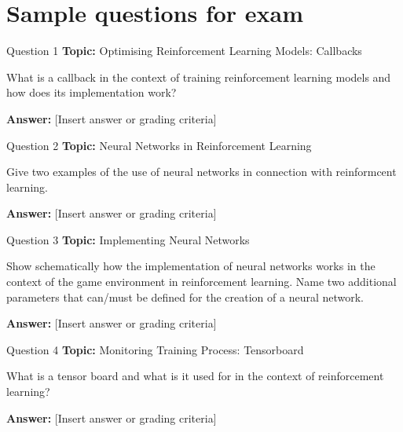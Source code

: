 \section{Sample questions for exam}

\begin{frame}{Question 1}
    \textbf{Topic:} Optimising Reinforcement Learning Models: Callbacks

    \vspace{10pt}

    What is a callback in the context of training reinforcement learning models and how does its implementation work?

    \vspace{20pt}

    \textbf{Answer:} [Insert answer or grading criteria]
\end{frame}

\begin{frame}{Question 2}
    \textbf{Topic:} Neural Networks in Reinforcement Learning
    \vspace{10pt}

    Give two examples of the use of neural networks in connection with reinformcent learning.

    \vspace{20pt}

    \textbf{Answer:} [Insert answer or grading criteria]
\end{frame}

\begin{frame}{Question 3}
    \textbf{Topic:} Implementing Neural Networks
    \vspace{10pt}

    Show schematically how the implementation of neural networks works in the context of the game environment in reinforcement learning. Name two additional parameters that can/must be defined for the creation of a neural network. 

    \vspace{20pt}

    \textbf{Answer:} [Insert answer or grading criteria]
\end{frame}

\begin{frame}{Question 4}
    \textbf{Topic:} Monitoring Training Process: Tensorboard
    \vspace{10pt}

    What is a tensor board and what is it used for in the context of reinforcement learning? 

    \vspace{20pt}

    \textbf{Answer:} [Insert answer or grading criteria]
\end{frame}

